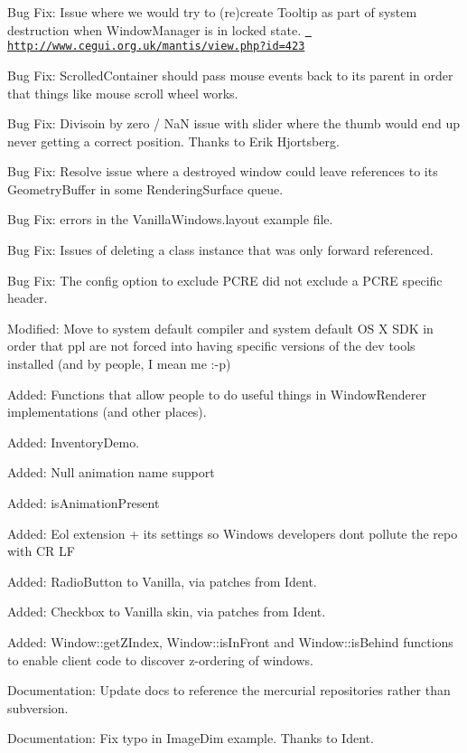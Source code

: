 \begin{DoxyItemize}
\item Bug Fix\+: Issue where we would try to (re)create Tooltip as part of system destruction when Window\+Manager is in locked state. \href{http://www.cegui.org.uk/mantis/view.php?id=423}{\texttt{ http\+://www.\+cegui.\+org.\+uk/mantis/view.\+php?id=423}}
\item Bug Fix\+: Scrolled\+Container should pass mouse events back to it\textquotesingle{}s parent in order that things like mouse scroll wheel works.
\item Bug Fix\+: Divisoin by zero / NaN issue with slider where the thumb would end up never getting a correct position. Thanks to Erik Hjortsberg.
\item Bug Fix\+: Resolve issue where a destroyed window could leave references to it\textquotesingle{}s Geometry\+Buffer in some Rendering\+Surface queue.
\item Bug Fix\+: errors in the Vanilla\+Windows.\+layout example file.
\item Bug Fix\+: Issues of deleting a class instance that was only forward referenced.
\item Bug Fix\+: The config option to exclude P\+C\+RE did not exclude a P\+C\+RE specific header.
\item Modified\+: Move to system default compiler and system default OS X S\+DK in order that ppl are not forced into having specific versions of the dev tools installed (and by \textquotesingle{}people\textquotesingle{}, I mean me \+:-\/p)
\item Added\+: Functions that allow people to do useful things in Window\+Renderer implementations (and other places).
\item Added\+: Inventory\+Demo.
\item Added\+: Null animation name support
\item Added\+: is\+Animation\+Present
\item Added\+: Eol extension + it\textquotesingle{}s settings so Windows developers don\textquotesingle{}t pollute the repo with CR LF
\item Added\+: Radio\+Button to Vanilla, via patches from Ident.
\item Added\+: Checkbox to Vanilla skin, via patches from Ident.
\item Added\+: Window\+::get\+Z\+Index, Window\+::is\+In\+Front and Window\+::is\+Behind functions to enable client code to discover z-\/ordering of windows.
\item Documentation\+: Update docs to reference the mercurial repositories rather than subversion.
\item Documentation\+: Fix typo in Image\+Dim example. Thanks to Ident.
\end{DoxyItemize}

